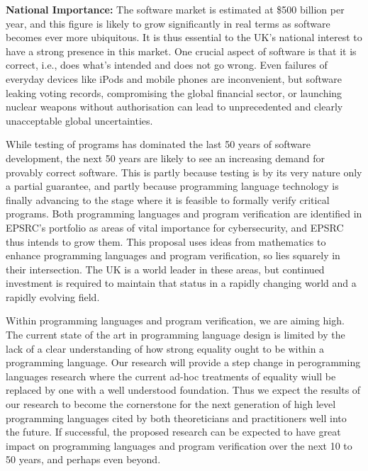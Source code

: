 \documentclass[a4paper,11pt]{article}
\begin{document}
{\bf National Importance:} The software market is estimated at \$500
billion per year, and this figure is likely to grow 
significantly in real terms 
as software becomes ever more
ubiquitous. It is thus essential to the UK's national interest to have a
strong presence in this market. One crucial aspect of software is that
it is correct, i.e., does what's intended and does not go wrong.  Even
failures of everyday devices like iPods and mobile phones are
inconvenient,
but software leaking voting records,
compromising %
the global financial sector, or launching 
nuclear weapons without authorisation 
can lead to unprecedented and clearly unacceptable global uncertainties.

While testing of programs has dominated the last 50 years of software
development,
the next 50 years are likely to see an increasing
demand for provably correct software. This is partly because testing
is by its very nature only a partial guarantee, and partly because
programming language technology is finally advancing to the stage
where it is feasible to formally verify critical programs.
Both programming languages and program verification are identified in
EPSRC's portfolio as areas of vital 
importance for cybersecurity, and EPSRC
thus intends to grow them.
This proposal 
uses ideas from mathematics  to enhance 
programming languages and  program
verification, so lies squarely in their intersection. %
The UK is a world leader
in these areas, but continued investment is required to maintain that
status in a rapidly changing world and a rapidly evolving field.

Within programming languages and program verification, we are aiming
high.  The current state of the art in programming language design is
limited by the lack of a clear understanding of how strong equality
ought to be within a programming language. Our research will provide a
step change in perogramming languages research where the current
ad-hoc treatments of equality wiull be replaced by one with a well
understood foundation. Thus we expect the results of our research to
become the cornerstone for the next generation of high level
programming languages cited by both
theoreticians and practitioners well into the future. If successful, 
the proposed research can
be expected to have great impact on programming languages and program
verification over the next 10 to 50 years, and perhaps even beyond. 
\end{document}

